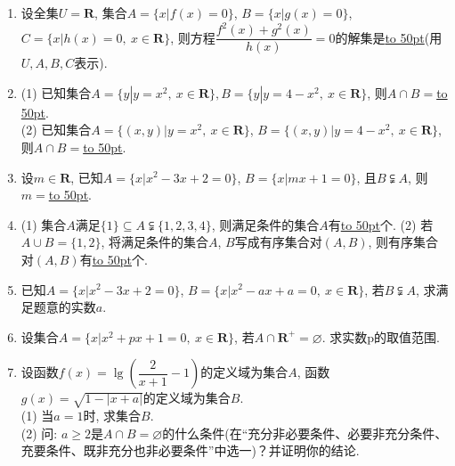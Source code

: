 \documentclass[10pt,a4paper]{article}
\newcommand{\blank}[1]{\underline{\hbox to #1pt{}}}
\begin{document}
\begin{enumerate}[1.]
\item 设全集$U=\mathbf{R}$, 集合$A=\{x|f(x)=0\}$, $B=\{x|g(x)=0\}$, $C=\{x|h(x)=0, \ x\in \mathbf{R}\}$, 则方程$\dfrac{f^2(x)+g^2(x)}{h(x)}=0$的解集是\blank{50}(用$U,A,B,C$表示).
\item (1) 已知集合$A=\{y|y=x^2, \ x\in \mathbf{R}\}, B=\{y|y=4-x^2, \ x\in \mathbf{R}\}$, 则$A\cap B=$\blank{50}.\\
(2) 已知集合$A=\{(x,y)|y={x^2},\ x\in \mathbf{R}\}$, $B=\{(x,y)|y=4-x^2, \ x\in \mathbf{R}\}$, 则$A\cap B=$\blank{50}.
\item 设$m\in \mathbf{R}$, 已知$A=\{x|x^2-3x+2=0\}$, $B=\{x|mx+1=0\}$, 且$B\subsetneqq A$, 则$m=$\blank{50}.
\item (1) 集合$A$满足$\{1\}\subseteq A \subsetneqq \{1,2,3,4\}$, 则满足条件的集合$A$有\blank{50}个.
(2) 若$A\cup B=\{1,2\}$, 将满足条件的集合$A$, $B$写成有序集合对$(A,B)$, 则有序集合对$(A,B)$有\blank{50}个.
\item 已知$A=\{x|x^2-3x+2=0\}$, $B=\{x|x^2-ax+a=0, \ x\in \mathbf{R}\}$, 若$B\subsetneqq A$, 求满足题意的实数$a$.
\item 设集合$A=\{x|x^2+px+1=0,\ x\in \mathbf{R}\}$, 若$A\cap \mathbf{R}^+=\varnothing$. 求实数p的取值范围.
\item 设函数$f(x)=\lg (\dfrac2{x+1}-1)$的定义域为集合$A$, 函数$g(x)=\sqrt{1-|x+a|}$的定义域为集合$B$.\\
(1) 当$a=1$时, 求集合$B$.\\
(2) 问: $a\ge 2$是$A\cap B=\varnothing$的什么条件(在``充分非必要条件、必要非充分条件、充要条件、既非充分也非必要条件''中选一)？并证明你的结论.



\end{enumerate}
\end{document}

